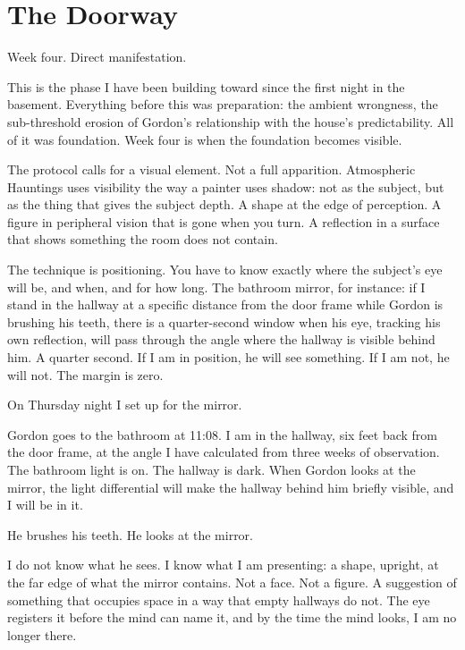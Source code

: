 
\chapter{The Doorway}

Week four. Direct manifestation.

This is the phase I have been building toward since the first night in the basement. Everything before this was preparation: the ambient wrongness, the sub-threshold erosion of Gordon's relationship with the house's predictability. All of it was foundation. Week four is when the foundation becomes visible.

The protocol calls for a visual element. Not a full apparition. Atmospheric Hauntings uses visibility the way a painter uses shadow: not as the subject, but as the thing that gives the subject depth. A shape at the edge of perception. A figure in peripheral vision that is gone when you turn. A reflection in a surface that shows something the room does not contain.

The technique is positioning. You have to know exactly where the subject's eye will be, and when, and for how long. The bathroom mirror, for instance: if I stand in the hallway at a specific distance from the door frame while Gordon is brushing his teeth, there is a quarter-second window when his eye, tracking his own reflection, will pass through the angle where the hallway is visible behind him. A quarter second. If I am in position, he will see something. If I am not, he will not. The margin is zero.

On Thursday night I set up for the mirror.

Gordon goes to the bathroom at 11:08. I am in the hallway, six feet back from the door frame, at the angle I have calculated from three weeks of observation. The bathroom light is on. The hallway is dark. When Gordon looks at the mirror, the light differential will make the hallway behind him briefly visible, and I will be in it.

He brushes his teeth. He looks at the mirror.

I do not know what he sees. I know what I am presenting: a shape, upright, at the far edge of what the mirror contains. Not a face. Not a figure. A suggestion of something that occupies space in a way that empty hallways do not. The eye registers it before the mind can name it, and by the time the mind looks, I am no longer there.

